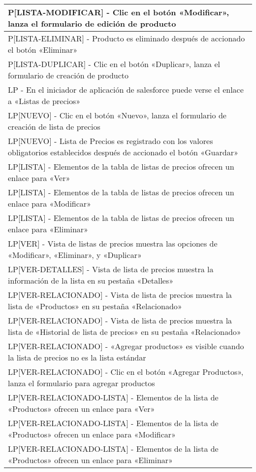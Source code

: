 \begin{longtable}{|p{15.0cm}|}
P[LISTA-MODIFICAR] - 		Clic en el botón «Modificar», lanza el formulario de edición de producto \\ \hline
P[LISTA-ELIMINAR] - 		Producto es eliminado después de accionado el botón «Eliminar» \\ \hline
P[LISTA-DUPLICAR] - 		Clic en el botón «Duplicar», lanza el formulario de creación de producto \\ \hline
LP - En el iniciador de aplicación de salesforce puede verse el enlace a «Listas de precios» \\ \hline
LP[NUEVO] - 		Clic en el botón «Nuevo», lanza el formulario de creación de lista de precios \\ \hline
LP[NUEVO] - 		Lista de Precios es registrado con los valores obligatorios establecidos después de accionado el botón «Guardar» \\ \hline
LP[LISTA] - 		Elementos de la tabla de listas de precios ofrecen un enlace para «Ver» \\ \hline
LP[LISTA] - 		Elementos de la tabla de listas de precios ofrecen un enlace para «Modificar» \\ \hline
LP[LISTA] - 		Elementos de la tabla de listas de precios ofrecen un enlace para «Eliminar» \\ \hline
LP[VER] - 		Vista de listas de precios muestra las opciones de «Modificar», «Eliminar», y «Duplicar» \\ \hline
LP[VER-DETALLES] - 		Vista de lista de precios muestra la información de la lista en su pestaña «Detalles» \\ \hline
LP[VER-RELACIONADO] - 		Vista de lista de precios muestra la lista de «Productos» en su pestaña «Relacionado» \\ \hline
LP[VER-RELACIONADO] - 		Vista de lista de precios muestra la lista de «Historial de lista de precios» en su pestaña «Relacionado» \\ \hline
LP[VER-RELACIONADO] - 		«Agregar productos» es visible cuando la lista de precios no es la lista estándar \\ \hline
LP[VER-RELACIONADO] - 		Clic en el botón «Agregar Productos», lanza el formulario para agregar productos \\ \hline
LP[VER-RELACIONADO-LISTA] - 		Elementos de la lista de «Productos» ofrecen un enlace para «Ver» \\ \hline
LP[VER-RELACIONADO-LISTA] - 		Elementos de la lista de «Productos» ofrecen un enlace para «Modificar» \\ \hline
LP[VER-RELACIONADO-LISTA] - 		Elementos de la lista de «Productos» ofrecen un enlace para «Eliminar» \\ \hline

\end{longtable}
